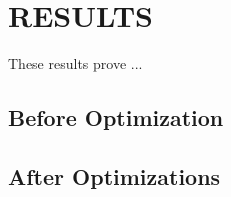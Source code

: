 
\setlength{\abovecaptionskip}{-5pt}
\setlength{\floatsep}{-5pt}
\setlength{\textfloatsep}{-5pt}

\chapter{RESULTS\label{ch:results}}

These results prove ...


\section{Before Optimization}


\section{After Optimizations}

